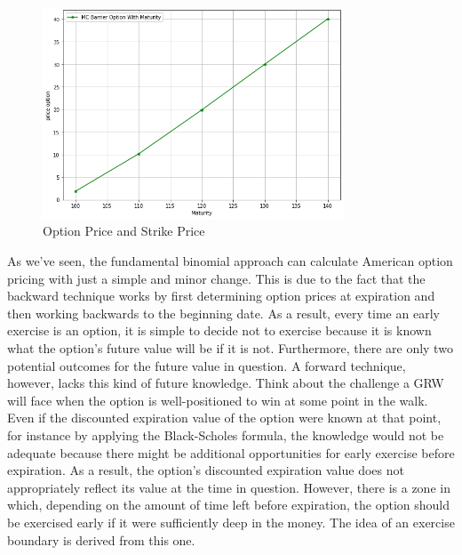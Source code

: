 \begin{figure}[H]
	\begin{center}
		\includegraphics[width=0.8\textwidth]{MC_Barrier_Option_With_Strike_Price}
	\end{center}
	\caption{Option Price and Strike Price}
\end{figure}


\noindent As we've seen, the fundamental binomial approach can calculate American option pricing with just a simple and minor change. This is due to the fact that the backward technique works by first determining option prices at expiration and then working backwards to the beginning date. As a result, every time an early exercise is an option, it is simple to decide not to exercise because it is known what the option's future value will be if it is not. Furthermore, there are only two potential outcomes for the future value in question.
A forward technique, however, lacks this kind of future knowledge. Think about the challenge a GRW will face when the option is well-positioned to win at some point in the walk. Even if the discounted expiration value of the option were known at that point, for instance by applying the Black-Scholes formula, the knowledge would not be adequate because there might be additional opportunities for early exercise before expiration. As a result, the option's discounted expiration value does not appropriately reflect its value at the time in question.
However, there is a zone in which, depending on the amount of time left before expiration, the option should be exercised early if it were sufficiently deep in the money. The idea of an exercise boundary is derived from this one.

